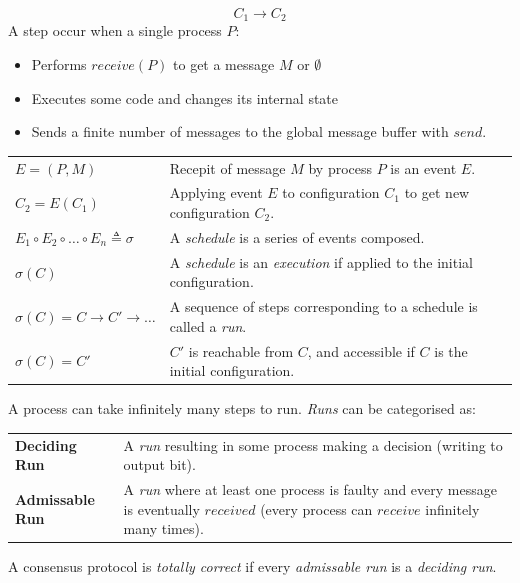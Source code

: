 \[C_1 \to C_2\]
A step occur when a single process $P$:
\begin{itemize}
    \item Performs $receive(P)$ to get a message $M$ or $\emptyset$
    \item Executes some code and changes its internal state
    \item Sends a finite number of messages to the global message buffer with $send$.
\end{itemize}
\begin{center}
    \begin{tabular}{l p{}}
        $E = (P,M)$                                             & Recepit of message $M$ by process $P$ is an event $E$.                                \\
        $C_2 = E(C_1)$                                          & Applying event $E$ to configuration $C_1$ to get new configuration $C_2$.             \\
        $E_1 \circ E_2 \circ \dots \circ E_n \triangleq \sigma$ & A \textit{schedule} is a series of events composed.                                   \\
        $\sigma (C)$                                            & A \textit{schedule} is an \textit{execution} if applied to the initial configuration. \\
        $\sigma(C) = C \to C' \to \dots$                        & A sequence of steps corresponding to a schedule is called a \textit{run}.             \\
        $\sigma(C) = C'$                                        & $C'$ is reachable from $C$, and accessible if $C$ is the initial configuration.       \\
    \end{tabular}
\end{center}
A process can take infinitely many steps to run. \textit{Runs} can be categorised as:
\begin{center}
    \begin{tabular}{l p{}}
        \textbf{Deciding Run}   & A \textit{run} resulting in some process making a decision (writing to output bit).                                                                 \\
        \textbf{Admissable Run} & A \textit{run} where at least one process is faulty and every message is eventually $received$ (every process can $receive$ infinitely many times). \\
    \end{tabular}
\end{center}
A consensus protocol is \textit{totally correct} if every \textit{admissable run} is a \textit{deciding run}.

